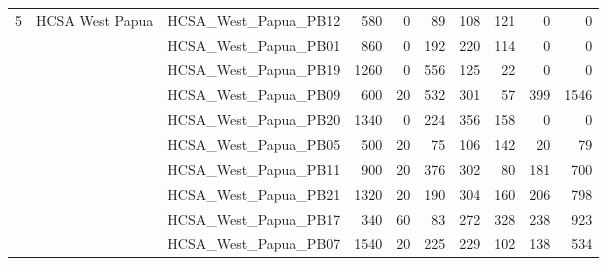 \documentclass[conference,a4paper]{IEEEtran}
\begin{document}
\begin{table}[!t]
\begin{tabular}{@{}r l l r r r r r r r@{}}
\midrule
5 & HCSA West Papua & HCSA\_West\_Papua\_PB12 & 580 & 0 & 89 & 108 & 121 & 0 & 0\\
 &  & HCSA\_West\_Papua\_PB01 & 860 & 0 & 192 & 220 & 114 & 0 & 0\\
 &  & HCSA\_West\_Papua\_PB19 & 1260 & 0 & 556 & 125 & 22 & 0 & 0\\
 &  & HCSA\_West\_Papua\_PB09 & 600 & 20 & 532 & 301 & 57 & 399 & 1546\\
 &  & HCSA\_West\_Papua\_PB20 & 1340 & 0 & 224 & 356 & 158 & 0 & 0\\
 &  & HCSA\_West\_Papua\_PB05 & 500 & 20 & 75 & 106 & 142 & 20 & 79\\
 &  & HCSA\_West\_Papua\_PB11 & 900 & 20 & 376 & 302 & 80 & 181 & 700\\
 &  & HCSA\_West\_Papua\_PB21 & 1320 & 20 & 190 & 304 & 160 & 206 & 798\\
 &  & HCSA\_West\_Papua\_PB17 & 340 & 60 & 83 & 272 & 328 & 238 & 923\\
 &  & HCSA\_West\_Papua\_PB07 & 1540 & 20 & 225 & 229 & 102 & 138 & 534\\
\bottomrule
\end{tabular}
\end{table}
\end{document}
